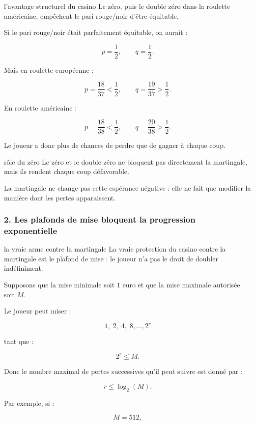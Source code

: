 \documentclass[11pt,a4paper]{article}
\begin{document}
\begin{idee}{l'avantage structurel du casino}
Le zéro, puis le double zéro dans la roulette américaine, empêchent le pari rouge/noir d'être équitable.
\end{idee}

Si le pari rouge/noir était parfaitement équitable, on aurait :

\[
p=\frac12,
\qquad
q=\frac12.
\]

Mais en roulette européenne :

\[
p=\frac{18}{37}<\frac12,
\qquad
q=\frac{19}{37}>\frac12.
\]

En roulette américaine :

\[
p=\frac{18}{38}<\frac12,
\qquad
q=\frac{20}{38}>\frac12.
\]

Le joueur a donc plus de chances de perdre que de gagner à chaque coup.

\begin{conclusionbox}{rôle du zéro}
Le zéro et le double zéro ne bloquent pas directement la martingale, mais ils rendent chaque coup défavorable.

La martingale ne change pas cette espérance négative : elle ne fait que modifier la manière dont les pertes apparaissent.
\end{conclusionbox}

\subsubsection*{2. Les plafonds de mise bloquent la progression exponentielle}

\begin{idee}{la vraie arme contre la martingale}
La vraie protection du casino contre la martingale est le plafond de mise : le joueur n'a pas le droit de doubler indéfiniment.
\end{idee}

Supposons que la mise minimale soit \(1\) euro et que la mise maximale autorisée soit \(M\).

Le joueur peut miser :

\[
1,\;2,\;4,\;8,\dots,2^r
\]

tant que :

\[
2^r\leq M.
\]

Donc le nombre maximal de pertes successives qu'il peut suivre est donné par :

\[
r\leq \log_2(M).
\]

Par exemple, si :

\[
M=512,
\]
\end{document}
